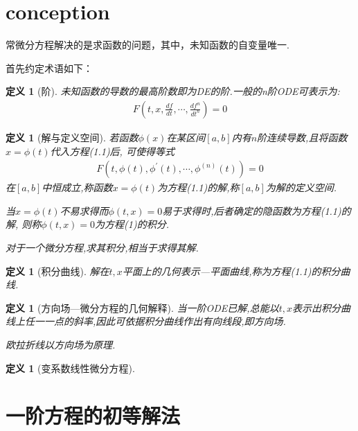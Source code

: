 \documentclass[12pt, a4paper, oneside]{ctexbook}
\newtheorem{definition}[theorem]{定义}
\begin{document}
    \section{conception}
        常微分方程解决的是求函数的问题，其中，未知函数的自变量唯一.\par
        首先约定术语如下：
        \begin{definition}[阶]
            未知函数的导数的最高阶数即为DE的阶.一般的n阶ODE可表示为:
            \begin{align}
                F(t,x,\frac{df}{dt},\cdots,\frac{df^n}{dt^n})=0
            \end{align}
        \end{definition}
        \begin{definition}[解与定义空间]
            若函数$\phi(x)$在某区间$[a,b]$内有$n$阶连续导数,且将函数$x= \phi(t)$代入方程(1.1)后,
            可使得等式
            \begin{align*}
                F(t,\phi(t),\phi^{'}(t),\cdots,\phi^{(n)} (t)) = 0
            \end{align*}
            在$[a,b]$中恒成立,称函数$ x= \phi(t) $为方程(1.1)的解,称$[a,b]$为解的定义空间.\par
            当$x= \phi(t)$不易求得而$ \phi(t,x)=0 $易于求得时,后者确定的隐函数为方程(1.1)的解,
            则称$ \phi(t,x) = 0 $为方程(1)的积分.\par
            对于一个微分方程,求其积分,相当于求得其解.

        \end{definition}
        \begin{definition}[积分曲线]
            解在$t,x$平面上的几何表示---平面曲线,称为方程(1.1)的积分曲线.
        \end{definition}
        \begin{definition}[方向场---微分方程的几何解释]
            当一阶ODE已解,总能以$t,x$表示出积分曲线上任一一点的斜率,因此可依据积分曲线作出有向线段,即方向场.\par
            欧拉折线以方向场为原理.
        \end{definition}
        \begin{definition}[变系数线性微分方程]
        \end{definition}
    \section{一阶方程的初等解法}
\end{document}
